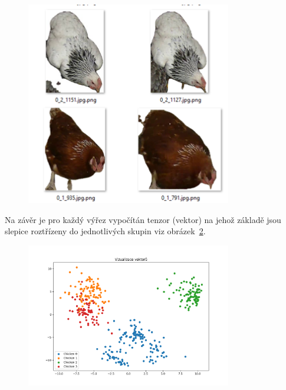 \begin{figure}[H]
    \centering
    \includegraphics[width=0.8\textwidth]{img/segmented_chicks}
    \label{fig:segmented_chicks2}
\end{figure}

Na závěr je pro každý výřez vypočítán tenzor (vektor) na jehož základě jsou slepice roztřízeny do jednotlivých skupin viz obrázek~\ref{fig:chicks_in_clusters}.

\begin{figure}[H]
    \centering
    \includegraphics[width=0.8\textwidth]{img/chicks_in_clusters}
    \label{fig:chicks_in_clusters}
\end{figure}

